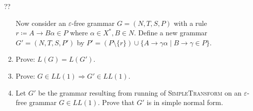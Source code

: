 \begin{exercise}{??}
\begin{enumerate}
Now consider an $\varepsilon$-free grammar $G=(N,T,S,P)$ with a rule $r \coloneqq A \rightarrow B \alpha \in P$ where $\alpha \in X^{*}, B \in N$. Define a new grammar $G'=(N,T,S,P')$ by $P'=(P \setminus \{r\}) \cup \{ A \rightarrow \gamma \alpha \mid B \rightarrow \gamma \in P \}$. 

\item Prove:  $L(G)=L(G')$.
\item Prove: $G \in LL(1) \Rightarrow G' \in LL(1)$.
\item Let $G'$ be the grammar resulting from running of \textsc{SimpleTransform} on an $\varepsilon$-free grammar $G\in LL(1)$. Prove that $G'$ is in simple normal form.
\end{enumerate}

\end{exercise}
%
%
%

